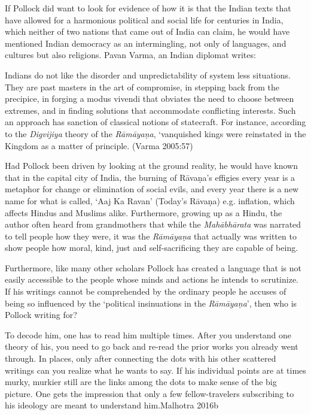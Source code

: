 If Pollock did want to look for evidence of how it is that the Indian texts that have allowed for a harmonious political and social life for centuries in India, which neither of two nations that came out of India can claim, he would have mentioned Indian democracy as an intermingling, not only of languages, and cultures but also religions. Pavan Varma, an Indian diplomat writes:

\begin{myquote}
Indians do not like the disorder and unpredictability of system less situations. They are past masters in the art of compromise, in stepping back from the precipice, in forging a modus vivendi that obviates the need to choose between extremes, and in finding solutions that accommodate conflicting interests. Such an approach has sanction of classical notions of statecraft. For instance, according to the \textit{Digvijiya} theory of the \textit{Rāmāyaṇa}, ‘vanquished kings were reinstated in the Kingdom as a matter of principle. \hfill (Varma 2005:57)
\end{myquote}

Had Pollock been driven by looking at the ground reality, he would have known that in the capital city of India, the burning of Rāvaṇa’s effigies every year is a metaphor for change or elimination of social evils, and every year there is a new name for what is called, ‘Aaj Ka Ravan’ (Today’s Rāvaṇa) e.g. inflation, which affects Hindus and Muslims alike. Furthermore, growing up as a Hindu, the author often heard from grandmothers that while the \textit{Mahābhārata} was narrated to tell people how they were, it was the \textit{Rāmāyaṇa} that actually was written to show people how moral, kind, just and self-sacrificing they are capable of being.

Furthermore, like many other scholars Pollock has created a language that is not easily accessible to the people whose minds and actions he intends to scrutinize. If his writings cannot be comprehended by the ordinary people he accuses of being so influenced by the ‘political insinuations in the \textit{Rāmāyaṇa}’, then who is Pollock writing for?

\begin{myquote}
To decode him, one has to read him multiple times. After you understand one theory of his, you need to go back and re-read the prior works you already went through. In places, only after connecting the dots with his other scattered writings can you realize what he wants to say. If his individual points are at times murky, murkier still are the links among the dots to make sense of the big picture. One gets the impression that only a few fellow-travelers subscribing to his ideology are meant to understand him.\hfill Malhotra 2016b
\end{myquote}

